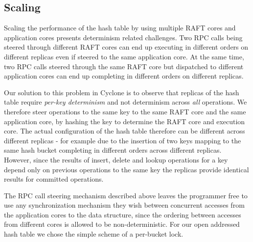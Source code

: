 \documentclass[letterpaper,twocolumn,10pt]{article}
\begin{document}
\subsection{Scaling}
Scaling the performance of the hash table by using multiple RAFT cores and
application cores presents determinism related challenges. Two RPC calls being
steered through different RAFT cores can end up executing in different orders on
different replicas even if steered to the same application core. At the same time,
two RPC calls steered through the same RAFT core but dispatched to different
application cores can end up completing in different orders on different replicas.

Our solution to this problem in Cyclone is to observe that replicas of the hash
table require \emph{per-key determinism} and not determinism across \emph{all}
operations. We therefore steer operations to the same key to the same RAFT core
and the same application core, by hashing the key to determine the RAFT core and
execution core. The actual configuration of the hash table therefore can be
different across different replicas - for example due to the insertion of two
keys mapping to the same hash bucket completing in different orders across
different replicas. However, since the results of insert, delete and lookup
operations for a key depend only on previous operations to the same key the
replicas provide identical results for committed operations.

The RPC call steering mechanism described above leaves the programmer free to
use any synchronization mechanism they wish between concurrent accesses from the
application cores to the data structure, since the ordering between accesses
from different cores is allowed to be non-deterministic. For our open addressed
hash table we chose the simple scheme of a per-bucket lock.
\end{document}
